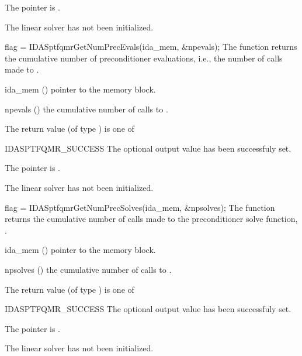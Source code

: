 {{\begin{args}
    The  pointer is .
  \item[\Id{IDASPTFQMR\_LMEM\_NULL}]
    The {\idasptfqmr} linear solver has not been initialized.
  \end{args}
}
{}
{
  flag = IDASptfqmrGetNumPrecEvals(ida\_mem, \&npevals);
}
{
  The function  returns the
  cumulative number of preconditioner evaluations, i.e., the number of 
  calls made to .
}
{
  \begin{args}[npevals]
  \item[ida\_mem] ()
    pointer to the {\ida} memory block.
  \item[npevals] ()
    the cumulative number of calls to .
  \end{args}
}
{
  The return value  (of type ) is one of
  \begin{args}
  \item[IDASPTFQMR\_SUCCESS] 
    The optional output value has been successfuly set.
  \item[\Id{IDASPTFQMR\_MEM\_NULL}]
    The  pointer is .
  \item[\Id{IDASPTFQMR\_LMEM\_NULL}]
    The {\idasptfqmr} linear solver has not been initialized.
  \end{args}
}
{}
{
  flag = IDASptfqmrGetNumPrecSolves(ida\_mem, \&npsolves);
}
{
  The function  returns the
  cumulative number of calls made to the preconditioner 
  solve function, .
}
{
  \begin{args}[npsolves]
  \item[ida\_mem] ()
    pointer to the {\ida} memory block.
  \item[npsolves] ()
    the cumulative number of calls to .
  \end{args}
}
{
  The return value  (of type ) is one of
  \begin{args}
  \item[IDASPTFQMR\_SUCCESS] 
    The optional output value has been successfuly set.
  \item[\Id{IDASPTFQMR\_MEM\_NULL}]
    The  pointer is .
  \item[\Id{IDASPTFQMR\_LMEM\_NULL}]
    The {\idasptfqmr} linear solver has not been initialized.
  \end{args}
}}
